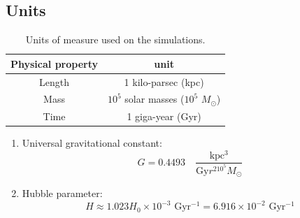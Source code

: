 \documentclass{beamer}
\newcommand{\sm}[0]{$M_\odot$}
\begin{document}
%	

\subsection{Units}


\begin{frame}{}
	\begin{table}[h]
		\centering
		\caption{Units of measure used on the simulations.}
		\label{tb: units}
		\begin{tabular}{c|c}
			\hline
			\textbf{Physical property} & \textbf{unit} \\
			\hline
			Length & 1 kilo-parsec (kpc) \\
			Mass & $10^5$ solar masses ($10^5$ \sm) \\
			Time & 1 giga-year (Gyr) \\
			\hline
		\end{tabular}
	\end{table}
	\begin{enumerate}
		\item Universal gravitational constant:
		\begin{equation}
			G = 0.4493 \quad \dfrac{\text{kpc$^3$}}{\text{Gy$r^210^5$\sm}}
		\end{equation}
		\item Hubble parameter:
			\begin{equation}
			H \approx 1.023 H_0 \times10^{-3} \text{ Gyr$^{-1}$} = 6.916\times10^{-2}\text{ Gyr$^{-1}$}
			\end{equation}
	\end{enumerate}
\end{frame}
\end{document}
